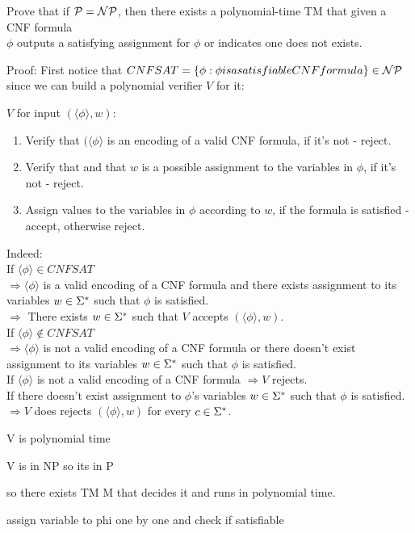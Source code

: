 Prove that if $\mathcal{P} = \mathcal{N}\mathcal{P}$, then there exists a polynomial-time TM that given a CNF formula \\
$\phi$ outputs a satisfying assignment for $\phi$ or indicates one does not exists.

Proof:
First notice that $CNFSAT = \{\phi: \phi is a satisfiable CNF formula\} \in \mathcal{N}\mathcal{P}$
since we can build a polynomial verifier $V$ for it:

$V$ for input $(\langle \phi \rangle, w)$:
\begin{enumerate}[1., itemsep=5pt]
    \item Verify that $(\langle \phi \rangle$ is an encoding of a valid CNF formula, if it's not - reject.

    \item Verify that and that $w$ is a possible assignment to the variables in $\phi$, if it's not - reject.

    \item Assign values to the variables in $\phi$ according to $w$, if the formula is satisfied - accept, otherwise reject.

\end{enumerate}

Indeed: \\
If $\langle \phi \rangle \in CNFSAT$ \\
$\Rightarrow \langle \phi \rangle$ is a valid encoding of a CNF formula
and there exists assignment to its variables $w \in \Sigma^*$ such that $\phi$ is satisfied. \\
$\Rightarrow $ There exists $w \in \Sigma^*$ such that $V$ accepts $(\langle \phi \rangle, w)$. \\

If $\langle \phi \rangle \notin CNFSAT$ \\
$\Rightarrow \langle \phi \rangle$ is not a valid encoding of a CNF formula
or there doesn't exist assignment to its variables $w \in \Sigma^*$ such that $\phi$ is satisfied. \\
If $\langle \phi \rangle$ is not a valid encoding of a CNF formula $\Rightarrow V$ rejects. \\
If there doesn't exist assignment to $\phi$'s variables $w \in \Sigma^*$ such that $\phi$ is satisfied. \\
$\Rightarrow V$ does rejects $(\langle \phi \rangle, w)$ for every $c \in \Sigma^*$.

V is polynomial time

V is in NP so its in P

so there exists TM M that decides it and runs in polynomial time.

assign variable to phi one by one and check if satisfiable



    {
        \color{red}
    }